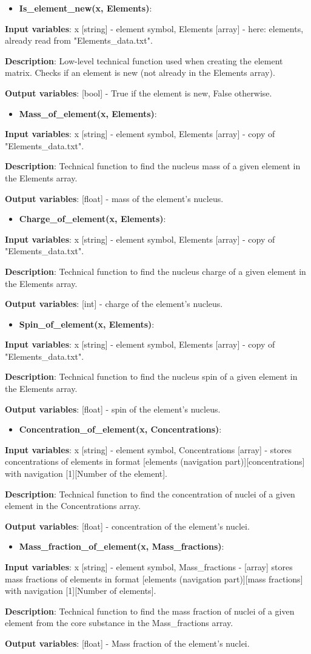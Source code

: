 \documentclass[a4paper,12pt]{article}
\newcommand{\namefunction}[4]{
  \begin{itemize}
    \item \textbf{#1}:
  \end{itemize}
  
  \textbf{Input variables}: #2.
  
  \textbf{Description}: #3.
  
  \textbf{Output variables}: #4.
}
\begin{document}
\vspace{1em}

\namefunction{Is\_element\_new(x, Elements)}{x [string] - element symbol, Elements [array] - here: elements, already read from "Elements\_data.txt"}{Low-level technical function used when creating the element matrix. Checks if an element is new (not already in the Elements array)}{[bool] - True if the element is new, False otherwise}

\vspace{1em}

\namefunction{Mass\_of\_element(x, Elements)}{x [string] - element symbol, Elements [array] - copy of "Elements\_data.txt"}{Technical function to find the nucleus mass of a given element in the Elements array}{[float] - mass of the element's nucleus}

\vspace{1em}

\namefunction{Charge\_of\_element(x, Elements)}{x [string] - element symbol, Elements [array] - copy of "Elements\_data.txt"}{Technical function to find the nucleus charge of a given element in the Elements array}{[int] - charge of the element's nucleus}

\vspace{1em}

\namefunction{Spin\_of\_element(x, Elements)}{x [string] - element symbol, Elements [array] - copy of "Elements\_data.txt"}{Technical function to find the nucleus spin of a given element in the Elements array}{[float] - spin of the element's nucleus}

\vspace{1em}

\namefunction{Concentration\_of\_element(x, Concentrations)}{x [string] - element symbol, Concentrations [array] - stores concentrations of elements in format [elements (navigation part)][concentrations] with navigation [1][Number of the element]}{Technical function to find the concentration of nuclei of a given element in the Concentrations array}{[float] - concentration of the element's nuclei}

\vspace{1em}

\namefunction{Mass\_fraction\_of\_element(x, Mass\_fractions)}{x [string] - element symbol, Mass\_fractions - [array] stores mass fractions of elements in format [elements (navigation part)][mass fractions] with navigation [1][Number of elements]}{Technical function to find the mass fraction of nuclei of a given element from the core substance in the Mass\_fractions array}{[float] - Mass fraction of the element's nuclei}
\end{document}

